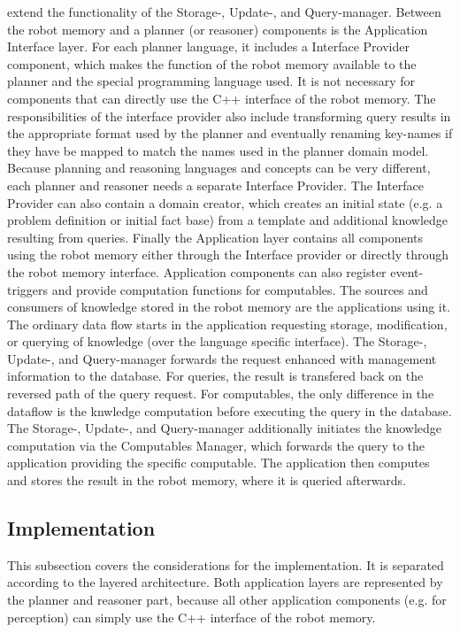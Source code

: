 \documentclass[a4paper,11pt]{article}
\begin{document}
extend the functionality of the Storage-, Update-, and
Query-manager.
Between the robot memory and a planner (or reasoner) components is the
Application Interface layer. For each planner language, it includes a
Interface Provider component, which makes the function of the robot
memory available to the planner and the special programming language
used. It is not necessary for components that can directly use the C++
interface of the robot memory. The responsibilities of the interface
provider also include transforming query results in the appropriate
format used by the planner and eventually renaming key-names if they
have be mapped to match the names used in the planner domain
model. Because planning and reasoning languages and concepts can be
very different, each planner and reasoner needs a separate Interface
Provider. The Interface Provider can also contain a domain creator,
which creates an initial state (e.g. a problem definition or initial
fact base) from a template and additional knowledge resulting from
queries. Finally the Application layer contains all components using
the robot memory either through the Interface provider or directly
through the robot memory interface. Application components can also
register event-triggers and provide computation functions for
computables. The sources and consumers of knowledge stored in the
robot memory are the applications using it. The ordinary data flow
starts in the application requesting storage, modification, or
querying of knowledge (over the language specific interface). The
Storage-, Update-, and Query-manager forwards the request enhanced
with management information to the database. For queries, the result
is transfered back on the reversed path of the query request. For
computables, the only difference in the dataflow is the knwledge
computation before executing the query in the database. The Storage-,
Update-, and Query-manager additionally initiates the knowledge
computation via the Computables Manager, which forwards the query to
the application providing the specific computable. The application
then computes and stores the result in the robot memory, where it is
queried afterwards.


\subsection{Implementation}
\label{sec:impl}
This subsection covers the considerations for the implementation. It is
separated according to the layered architecture. Both application
layers are represented by the planner and reasoner part, because all
other application components (e.g. for perception) can simply use the
C++ interface of the robot memory.
\end{document}
